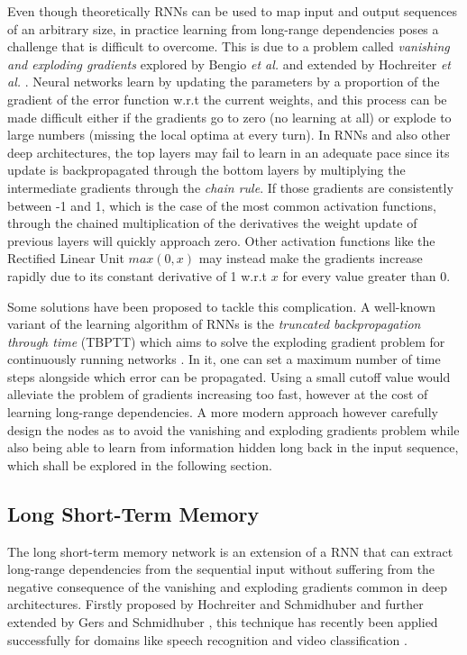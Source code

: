 \documentclass{kththesis}
\begin{document}
Even though theoretically RNNs can be used to map input and output sequences of an arbitrary size, in practice learning from long-range dependencies poses a challenge that is difficult to overcome. This is due to a problem called \emph{vanishing and exploding gradients} explored by Bengio \emph{et al.} \citep{bengio1994learning} and extended by Hochreiter \emph{et al.} \citep{hochreiter2001gradient}. Neural networks learn by updating the parameters by a proportion of the gradient of the error function w.r.t the current weights, and this process can be made difficult either if the gradients go to zero (no learning at all) or explode to large numbers (missing the local optima at every turn). In RNNs and also other deep architectures, the top layers may fail to learn in an adequate pace since its update is backpropagated through the bottom layers by multiplying the intermediate gradients through the \emph{chain rule}. If those gradients are consistently between -1 and 1, which is the case of the most common activation functions, through the chained multiplication of the derivatives the weight update of previous layers will quickly approach zero. Other activation functions like the Rectified Linear Unit $max(0,x)$ may instead make the gradients increase rapidly due to its constant derivative of 1 w.r.t $x$ for every value greater than 0.

Some solutions have been proposed to tackle this complication. A well-known variant of the learning algorithm of RNNs is the \emph{truncated backpropagation through time} (TBPTT) which aims to solve the exploding gradient problem for continuously running networks \citep{williams1989learning}. In it, one can set a maximum number of time steps alongside which error can be propagated. Using a small cutoff value would alleviate the problem of gradients increasing too fast, however at the cost of learning long-range dependencies. A more modern approach however carefully design the nodes as to avoid the vanishing and exploding gradients problem while also being able to learn from information hidden long back in the input sequence, which shall be explored in the following section.

\subsection{Long Short-Term Memory}

The long short-term memory network is an extension of a RNN that can extract long-range dependencies from the sequential input without suffering from the negative consequence of the vanishing and exploding gradients common in deep architectures. Firstly proposed by Hochreiter and Schmidhuber \citep{hochreiter1997long} and further extended by Gers and Schmidhuber \citep{gers1999learning}, this technique has recently been applied successfully for domains like speech recognition \citep{graves2013speech} and video classification \citep{yue2015beyond}.
\end{document}
